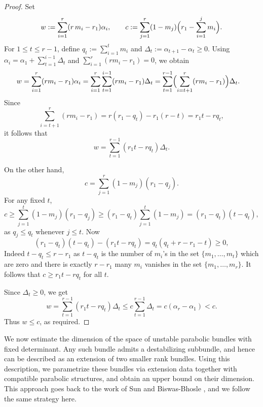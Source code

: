 \documentclass[11pt, reqno]{amsart}
\numberwithin{equation}{section}
\theoremstyle{definition}
\begin{document}
\begin{proof}
Set
\[
w:=\sum_{i=1}^r (r\,m_i-r_1)\alpha_i, \qquad
c:=\sum_{j=1}^{r}(1-m_j)\Bigl(r_1-\sum_{i=1}^{j}m_i\Bigr).
\]
For $1\le t\le r-1$, define $q_t:=\sum\limits_{i=1}^t m_i$ and $\Delta_t:=\alpha_{t+1}-\alpha_t\ge 0$.
Using $\alpha_i=\alpha_1+\sum\limits_{t=1}^{i-1}\Delta_t$ and $\sum\limits_{i=1}^r(rm_i-r_1)=0$, we obtain
\begin{align*}
w
&= \sum_{i=1}^r (rm_i-r_1)\alpha_i
= \sum_{i=1}^r \sum_{t=1}^{i-1} (rm_i-r_1)\Delta_t
= \sum_{t=1}^{r-1}\Bigl(\sum_{i=t+1}^r (rm_i-r_1)\Bigr)\Delta_t.
\end{align*}
Since
\[
\sum_{i=t+1}^r (rm_i-r_1)=r(r_1-q_t)-r_1(r-t)=r_1 t-r q_t,
\]
it follows that
\[
w=\sum_{t=1}^{r-1}(r_1 t-r q_t)\Delta_t.
\]

On the other hand,
\[
c=\sum_{j=1}^r (1-m_j)(r_1-q_j).
\]
For any fixed $t$,
\[
c \ge \sum_{j=1}^t (1-m_j)(r_1-q_j)
\ge (r_1-q_t)\sum_{j=1}^t (1-m_j)
= (r_1-q_t)(t-q_t),
\]
as $q_j\le q_t$ whenever $j\le t$. Now
\[
(r_1-q_t)(t-q_t)-(r_1 t-r q_t)=q_t(q_t+r-r_1-t)\ge 0,
\]
Indeed $t-q_t\le r-r_1$ as $t-q_t$ is the number of $m_i$'s in the set $\{ m_1, \ldots , m_t\}$ which are zero and there is exactly $r-r_1$ many $m_i$ vanishes in the set $\{ m_1, \ldots , m_r\}$. It follows that $c\ge r_1 t-r q_t$ for all $t$.

Since $\Delta_t\ge 0$, we get
\[
w=\sum_{t=1}^{r-1}(r_1 t-r q_t)\Delta_t
\le c\sum_{t=1}^{r-1}\Delta_t
= c(\alpha_r-\alpha_1) < c.
\]
Thus $w\le c$, as required.
\end{proof}

We now estimate the dimension of the space of unstable parabolic bundles with fixed determinant. Any such bundle admits a destabilizing subbundle, and hence can be described as an extension of two smaller rank bundles. Using this description, we parametrize these bundles via extension data together with compatible parabolic structures, and obtain an upper bound on their dimension. This approach goes back to the work of Sun \cite{S00} and Biswas-Bhosle \cite{BB23}, and we follow the same strategy here.
\end{document}
